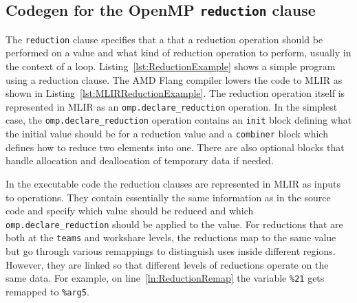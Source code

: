 \documentclass[acmtog,natbib=false]{acmart}
\newcommand{\code}[1]{\texttt{#1}\xspace}
\begin{document}



\subsection{Codegen for the OpenMP \code{reduction} clause}
\label{sec:OpenMPReduction}
The \code{reduction} clause specifies that a that a reduction operation should be performed on a value and what kind of reduction operation to perform, usually in the context of a loop.
Listing~\ref{lst:ReductionExample} shows a simple program using a reduction clause.
The AMD Flang compiler lowers the code to MLIR as shown in Listing~\ref{lst:MLIRReductionExample}.
The reduction operation itself is represented in MLIR as an \code{omp.declare\_reduction} operation.
In the simplest case, the \code{omp.declare\_reduction} operation contains an \code{init} block defining what the initial value should be for a reduction value and a \code{combiner} block which defines how to reduce two elements into one.
There are also optional blocks that handle allocation and deallocation of temporary data if needed.

In the executable code the reduction clauses are represented in \ac{MLIR} as inputs to operations. They contain essentially the same information as in the source code and specify which value should be reduced and which \code{omp.declare\_reduction} should be applied to the value.
For reductions that are both at the \code{teams} and workshare levels, the reductions map to the same value but go through various remappings to distinguish uses inside different regions. However, they are linked so that different levels of reductions operate on the same data. For example, on line~\ref{ln:ReductionRemap} the variable \code{\%21} gets remapped to \code{\%arg5}.
\end{document}
